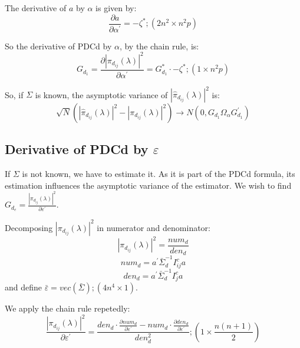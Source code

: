 \documentclass[a4paper,10pt]{article}
\begin{document}
The derivative of $a$ by $\alpha$ is given by:
\begin{equation}
\frac{\partial a}{\partial \alpha^{'}} = -\zeta^{\ast}; (2n^{2} \times n^{2}p)
\end{equation}

So the derivative of PDCd by $\alpha$, by the chain rule, is:
\begin{equation}
G_{d_1} = \frac{\partial |\pi_{d_{ij}}(\lambda)|^{2}}{\partial \alpha^{'}} = G_{d_1}^{\ast} \cdot -\zeta^{\ast}; (1 \times n^{2}p)
\end{equation}

So, if $\Sigma$ is known, the asymptotic variance of $|\hat{\pi}_{d_{ij}}(\lambda)|^{2}$ is:
\begin{equation}
\sqrt{N} (|\hat{\pi}_{d_{ij}}(\lambda)|^{2} - |\pi_{d_{ij}}(\lambda)|^{2}) \to N(0, G_{d_1} \Omega_{\alpha} G_{d_1}^{'}) 
\end{equation}

\subsection{Derivative of PDCd by $\varepsilon$}

If $\Sigma$ is not known, we have to estimate it. As it is part of the PDCd formula, its estimation influences the asymptotic variance of the estimator. We wish to find  $G_{d_e} = \frac{|\pi_{d_{ij}}(\lambda)|^{2}}{\partial \varepsilon^{'}}$.

Decomposing $|\pi_{d_{ij}}(\lambda)|^{2}$ in numerator and denominator:
\begin{equation}
|\pi_{d_{ij}}(\lambda)|^{2} = \frac{num_{d}}{den_{d}}
\end{equation}
\begin{equation}
num_{d} = a^{'} \bar{\Sigma}_{d}^{-1} I_{ij}^{c} a
\end{equation}
\begin{equation}
den_{d} = a^{'} \bar{\Sigma}_{d}^{-1} I_{j}^{c} a
\end{equation}
and define $\bar{\varepsilon} = vec(\bar{\Sigma}); (4n^{4} \times 1)$.

We apply the chain rule repetedly:
\begin{equation}
\frac{|\pi_{d_{ij}}(\lambda)|^{2}}{\partial \varepsilon^{'}} = \frac{den_{d} \cdot \frac{\partial num_{d}}{\partial \varepsilon^{'}} - num_{d} \cdot \frac{\partial den_{d}}{\partial \varepsilon^{'}}}{den_{d}^{2}}; (1 \times \frac{n(n+1)}{2})
\end{equation}
\end{document}
